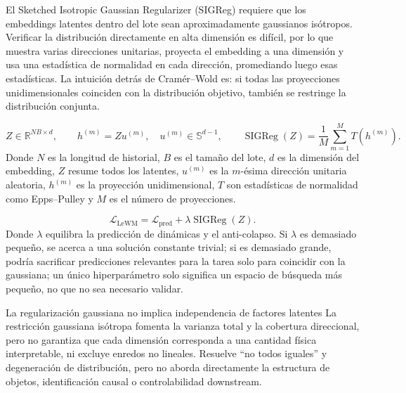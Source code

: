 El Sketched Isotropic Gaussian Regularizer (SIGReg) requiere que los embeddings latentes dentro del lote sean aproximadamente gaussianos isótropos. Verificar la distribución directamente en alta dimensión es difícil, por lo que muestra varias direcciones unitarias, proyecta el embedding a una dimensión y usa una estadística de normalidad en cada dirección, promediando luego esas estadísticas. La intuición detrás de Cramér--Wold es: si todas las proyecciones unidimensionales coinciden con la distribución objetivo, también se restringe la distribución conjunta.


\[
Z\in\mathbb{R}^{NB\times d},
\qquad
h^{(m)}=Zu^{(m)},\quad u^{(m)}\in\mathbb{S}^{d-1},
\qquad
\operatorname{SIGReg}(Z)=\frac{1}{M}\sum_{m=1}^{M}T\!\left(h^{(m)}\right).
\]
Donde $N$ es la longitud de historial, $B$ es el tamaño del lote, $d$ es la dimensión del embedding, $Z$ resume todos los latentes, $u^{(m)}$ es la $m$-ésima dirección unitaria aleatoria, $h^{(m)}$ es la proyección unidimensional, $T$ son estadísticas de normalidad como Epps--Pulley y $M$ es el número de proyecciones.

\[
\mathcal{L}_{\text{LeWM}}
=\mathcal{L}_{\text{pred}}+\lambda\operatorname{SIGReg}(Z).
\]
Donde $\lambda$ equilibra la predicción de dinámicas y el anti-colapso. Si $\lambda$ es demasiado pequeño, se acerca a una solución constante trivial; si es demasiado grande, podría sacrificar predicciones relevantes para la tarea solo para coincidir con la gaussiana; un único hiperparámetro solo significa un espacio de búsqueda más pequeño, no que no sea necesario validar.


\begin{warningbox}{La regularización gaussiana no implica independencia de factores latentes}
La restricción gaussiana isótropa fomenta la varianza total y la cobertura direccional, pero no garantiza que cada dimensión corresponda a una cantidad física interpretable, ni excluye enredos no lineales. Resuelve ``no todos iguales'' y degeneración de distribución, pero no aborda directamente la estructura de objetos, identificación causal o controlabilidad downstream.
\end{warningbox}

